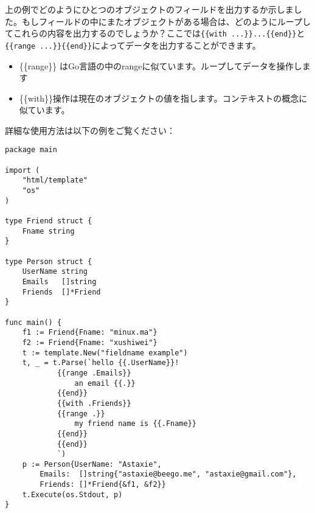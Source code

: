 上の例でどのようにひとつのオブジェクトのフィールドを出力するか示しました。もしフィールドの中にまたオブジェクトがある場合は、どのようにループしてこれらの内容を出力するのでしょうか？ここでは\texttt{\{\{with ...\}\}...\{\{end\}\}}と\texttt{\{\{range ...\}\}\{\{end\}\}}によってデータを出力することができます。

\begin{itemize}
  \item \{\{range\}\} はGo言語の中のrangeに似ています。ループしてデータを操作します
  \item \{\{with\}\}操作は現在のオブジェクトの値を指します。コンテキストの概念に似ています。
\end{itemize}

詳細な使用方法は以下の例をご覧ください：

\begin{lstlisting}[numbers=none]
package main

import (
    "html/template"
    "os"
)

type Friend struct {
    Fname string
}

type Person struct {
    UserName string
    Emails   []string
    Friends  []*Friend
}

func main() {
    f1 := Friend{Fname: "minux.ma"}
    f2 := Friend{Fname: "xushiwei"}
    t := template.New("fieldname example")
    t, _ = t.Parse(`hello {{.UserName}}!
            {{range .Emails}}
                an email {{.}}
            {{end}}
            {{with .Friends}}
            {{range .}}
                my friend name is {{.Fname}}
            {{end}}
            {{end}}
            `)
    p := Person{UserName: "Astaxie",
        Emails:  []string{"astaxie@beego.me", "astaxie@gmail.com"},
        Friends: []*Friend{&f1, &f2}}
    t.Execute(os.Stdout, p)
}
\end{lstlisting}
